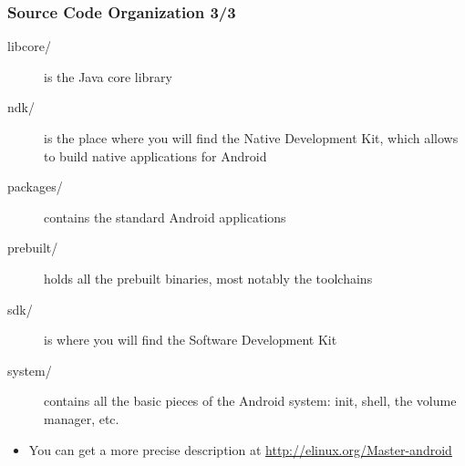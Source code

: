 \begin{frame}
  \frametitle{Source Code Organization 3/3}
  \begin{description}
  \item[libcore/] is the Java core library
  \item[ndk/] is the place where you will find the Native Development
    Kit, which allows to build native applications for Android
  \item[packages/] contains the standard Android applications
  \item[prebuilt/] holds all the prebuilt binaries, most notably the
    toolchains
  \item[sdk/] is where you will find the Software Development Kit
  \item[system/] contains all the basic pieces of the Android system:
    init, shell, the volume manager, etc.
  \end{description}
  \begin{itemize}
  \item You can get a more precise description at
    \url{http://elinux.org/Master-android}
  \end{itemize}
\end{frame}

